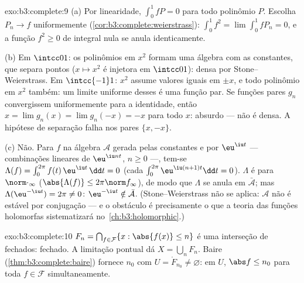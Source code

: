 \begin{solution}{exo:b3:complete:9}
(a) Por linearidade, $\int_0^1 fP = 0$ para todo polinômio $P$.
Escolha $P_n \to f$ uniformemente
(\cref{cor:b3:complete:weierstrass}): $\int_0^1 f^2 =
\lim\int_0^1 fP_n = 0$, e a função  $f^2 \geq 0$ de
integral nula se anula identicamente.

(b) Em $\intcc01$: os polinômios em $x^2$ formam uma álgebra
com as constantes, que separa pontos ($x \mapsto x^2$ é injetora
em $\intcc01$): densa por Stone--Weierstrass. Em $\intcc{-1}1$:
$x^2$ assume valores iguais em $\pm x$, e todo
polinômio em $x^2$ também: um limite uniforme desses é uma função
par. Se funções pares $g_n$ convergissem uniformemente para a
identidade, então $x = \lim g_n(x) = \lim g_n(-x) = -x$ para todo
$x$: absurdo --- não é densa. A hipótese de separação falha nos
pares $\{x, -x\}$.

(c) Não. Para $f$ na álgebra $\mathcal A$ gerada pelas
constantes e por $\eu^{\iu t}$ --- combinações lineares de
$\eu^{\iu nt}$, $n \geq 0$ ---, tem-se $\Lambda(f) =
\int_0^{2\pi}f(t)\,\eu^{\iu t}\,\dd t = 0$ (cada
$\int_0^{2\pi}\eu^{\iu(n+1)t}\dd t = 0$). $\Lambda$ é
 para $\norm\cdot_\infty$ ($\abs{\Lambda(f)}\leq
2\pi\norm f_\infty$), de modo que $\Lambda$ se anula em $\bar{\mathcal
A}$; mas $\Lambda(\eu^{-\iu t}) = 2\pi \neq 0$: $\eu^{-\iu t}
\notin \bar{\mathcal A}$. (Stone--Weierstrass não se aplica:
$\mathcal A$ não é estável por conjugação --- e o
obstáculo é precisamente o que a teoria das funções
holomorfas sistematizará no~\cref{ch:b3:holomorphic}.)
\end{solution}

\begin{solution}{exo:b3:complete:10}
$F_n = \bigcap_{f \in \mathcal F}\{x : \abs{f(x)} \leq n\}$ é
uma interseção de fechados: fechado. A limitação pontual
dá $X = \bigcup_n F_n$. Baire (\cref{thm:b3:complete:baire})
fornece $n_0$ com $U = \mathring F_{n_0} \neq \varnothing$:
em $U$, $\abs f \leq n_0$ para toda $f \in \mathcal F$
simultaneamente.
\end{solution}

